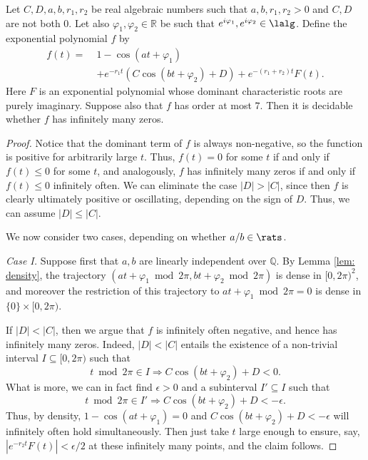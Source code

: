 \begin{lemma}\label{lem: layered}
Let $C, D, a, b, r_1, r_2$ be real algebraic numbers such that 
$a, b, r_1, r_2 > 0$ and $C, D$ are not both $0$.
Let also $\varphi_1,\varphi_2\in\mathbb{R}$ be
such that
$e^{i\varphi_1},e^{i\varphi_2}\in\lalg$.  
Define the exponential polynomial $f$ by
\begin{align*}
f(t) = \; & 1-\cos(at + \varphi_1) \\
& + e^{-r_1t}(C\cos(bt+\varphi_2) + D) + e^{-(r_1+r_2)t}F(t).
\end{align*}
Here $F$ is an exponential polynomial whose
dominant characteristic roots are purely imaginary. Suppose also
that $f$ has order at most $7$.
Then it is decidable whether $f$ has infinitely many
zeros. 
\end{lemma}
\begin{proof}
Notice that the dominant term of $f$ is always non-negative, so the
function is positive for arbitrarily large $t$. Thus, $f(t)=0$ for
some $t$ if and only if $f(t)\leq 0$ for some $t$, and analogously,
$f$ has infinitely many zeros if and only if $f(t)\leq 0$
infinitely often. We can eliminate the 
case $|D|>|C|$, since then $f$ is clearly ultimately positive 
or oscillating, depending on the sign of $D$. 
Thus, we can assume $|D|\leq|C|$.


We now consider two cases, depending on whether $a/b \in \rats$.

\emph{Case I.}
Suppose first that $a, b$ are linearly independent over
$\mathbb{Q}$. By Lemma \ref{lem: density}, the trajectory
$(at+\varphi_1 \bmod 2\pi,bt + \varphi_2\bmod 2\pi)$ 
is dense in $[0,2\pi)^2$, and moreover the restriction
of this trajectory to $at + \varphi_1 \bmod 2\pi = 0$ is
dense in $\{0\}\times [0, 2\pi)$. 

If $|D| < |C|$, then we argue that $f$ is infinitely often 
negative, and hence has infinitely many zeros.
Indeed, $|D| < |C|$ entails the existence of a non-trivial interval 
$I\subseteq [0,2\pi)$ such that 
\[ t\bmod 2\pi\in I \Rightarrow C\cos(bt+\varphi_2) + D < 0. \]
What is more, we can in fact find $\epsilon>0$ and a subinterval 
$I' \subseteq I$ such that
\[ t\bmod 2\pi\in I' \Rightarrow C\cos(bt+\varphi_2)+D < -\epsilon. \] 
Thus, by density, 
$1 - \cos(at + \varphi_1)=0$ and $C\cos(bt+\varphi_2) + D < -\epsilon$
will infinitely often hold simultaneously. Then just take $t$ large enough to 
ensure, say, $|e^{-r_2t}F(t)| < \epsilon/2$ at these infinitely
many points, and the claim follows.


\end{proof}
